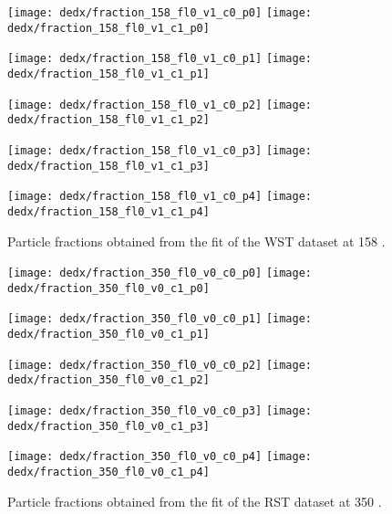 \clearpage


\begin{figure}
  \centering
  \texttt{[image: dedx/fraction\_158\_fl0\_v1\_c0\_p0]}
  \texttt{[image: dedx/fraction\_158\_fl0\_v1\_c1\_p0]}

  \texttt{[image: dedx/fraction\_158\_fl0\_v1\_c0\_p1]}
  \texttt{[image: dedx/fraction\_158\_fl0\_v1\_c1\_p1]}

  \texttt{[image: dedx/fraction\_158\_fl0\_v1\_c0\_p2]}
  \texttt{[image: dedx/fraction\_158\_fl0\_v1\_c1\_p2]}


  \texttt{[image: dedx/fraction\_158\_fl0\_v1\_c0\_p3]}
  \texttt{[image: dedx/fraction\_158\_fl0\_v1\_c1\_p3]}

  \texttt{[image: dedx/fraction\_158\_fl0\_v1\_c0\_p4]}
  \texttt{[image: dedx/fraction\_158\_fl0\_v1\_c1\_p4]}

  \caption{Particle fractions obtained from the fit of the WST dataset at 158 \GeVc.}
  \label{fig:hadron:dedx:fit:frac158w}
\end{figure}


\begin{figure}
  \centering
  \texttt{[image: dedx/fraction\_350\_fl0\_v0\_c0\_p0]}
  \texttt{[image: dedx/fraction\_350\_fl0\_v0\_c1\_p0]}

  \texttt{[image: dedx/fraction\_350\_fl0\_v0\_c0\_p1]}
  \texttt{[image: dedx/fraction\_350\_fl0\_v0\_c1\_p1]}

  \texttt{[image: dedx/fraction\_350\_fl0\_v0\_c0\_p2]}
  \texttt{[image: dedx/fraction\_350\_fl0\_v0\_c1\_p2]}


  \texttt{[image: dedx/fraction\_350\_fl0\_v0\_c0\_p3]}
  \texttt{[image: dedx/fraction\_350\_fl0\_v0\_c1\_p3]}

  \texttt{[image: dedx/fraction\_350\_fl0\_v0\_c0\_p4]}
  \texttt{[image: dedx/fraction\_350\_fl0\_v0\_c1\_p4]}

  \caption{Particle fractions obtained from the fit of the RST dataset at 350 \GeVc.}
  \label{fig:hadron:dedx:fit:frac350r}
\end{figure}

